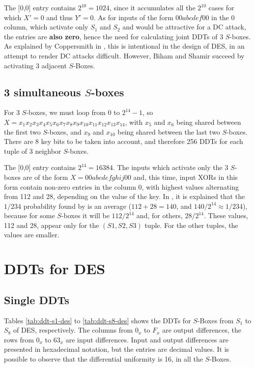 \documentclass{report}
\begin{document}
The [0,0] entry contains $2^{10} = 1024$, since it accumulates all the $2^{10}$ cases for which $X' = 0$ and thus $Y' = 0$. As for inputs of the form $00abcdef00$ in the 0 column, which activate only $S_1$ and $S_2$ and would be attractive for a DC attack, the entries are \textbf{also zero}, hence the need for calculating joint DDTs of 3 $S$-boxes. As explained by Coppersmith in \cite{Coppersmith1994}, this is intentional in the design of DES, in an attempt to render DC attacks difficult. However, Biham and Shamir \cite{Shamir} succeed by activating 3 adjacent $S$-Boxes.

\subsection{3 simultaneous $S$-boxes}

For 3 $S$-boxes, we must loop from 0 to $2^{14}-1$, so $X = x_1x_2x_3x_4x_5x_6x_7x_8x_9x_{10}x_{11}x_{12}x_{13}x_{14}$, with $x_5$ and $x_6$ being shared between the first two $S$-boxes,  and $x_9$ and $x_{10}$ being shared between the last two $S$-boxes. There are 8 key bits to be taken into account, and therefore 256 DDTs for each tuple of 3 neighbor $S$-boxes.

The [0,0] entry contains $2^{14} = 16384$. The inputs which activate only the 3 $S$-boxes are of the form $X = 00abcdefghij00$ and, this time, input XORs in this form contain non-zero entries in the column 0, with highest values alternating from 112 and 28, depending on the value of the key. In \cite{Knudsen}, it is explained that the $1/234$ probability found by \cite{Shamir} is an average ($112 + 28 = 140$, and $140/2^{14} \approx 1/234$), because for some $S$-boxes it will be $112/2^{14}$ and, for others, $28/2^{14}$. These values, 112 and 28, appear only for the $(S1, S2, S3)$ tuple. For the other tuples, the values are smaller.

\section{DDTs for DES}

\subsection{Single DDTs}

Tables \ref{tab:ddt-s1-des} to \ref{tab:ddt-s8-des} shows the DDTs for $S$-Boxes from $S_1$ to $S_8$ of DES, respectively. The columns from $0_x$ to $F_x$ are output differences, the rows from $0_x$ to $63_x$ are input differences. Input and output differences are presented in hexadecimal notation, but the entries are decimal values. It is possible to observe that the differential uniformity is 16, in all the $S$-Boxes.
\end{document}
